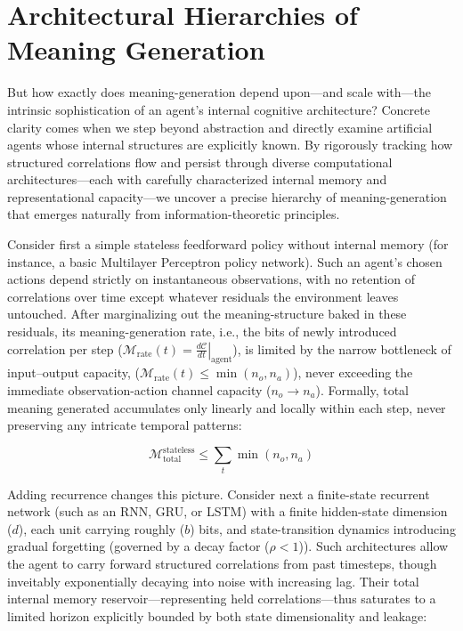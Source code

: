 \section{Architectural Hierarchies of Meaning Generation}\label{sec:architectures}

But how exactly does meaning-generation depend upon---and scale with---the intrinsic sophistication of an agent's internal cognitive architecture? Concrete clarity comes when we step beyond abstraction and directly examine artificial agents whose internal structures are explicitly known. By rigorously tracking how structured correlations flow and persist through diverse computational architectures---each with carefully characterized internal memory and representational capacity---we uncover a precise hierarchy of meaning-generation that emerges naturally from information-theoretic principles.

Consider first a simple stateless feedforward policy without internal memory (for instance, a basic Multilayer Perceptron policy network). Such an agent's chosen actions depend strictly on instantaneous observations, with no retention of correlations over time except whatever residuals the environment leaves untouched. After marginalizing out the meaning-structure baked in these residuals, its meaning-generation rate, i.e., the bits of newly introduced correlation per step ($\mathcal{M}_\text{rate}(t) = \left.\frac{d\mathcal{C}}{dt}\right\vert_{\text{agent}}$), is limited by the narrow bottleneck of input--output capacity, ($\mathcal{M}_\text{rate}(t) \leq \min(n_o, n_a)$), never exceeding the immediate observation-action channel capacity ($n_o \rightarrow n_a$). Formally, total meaning generated accumulates only linearly and locally within each step, never preserving any intricate temporal patterns:

\begin{equation*}
\mathcal{M}_{\text{total}}^{\text{stateless}} \leq \sum_t \min(n_o, n_a)
\end{equation*}

Adding recurrence changes this picture. Consider next a finite-state recurrent network (such as an RNN, GRU, or LSTM) with a finite hidden-state dimension ($d$), each unit carrying roughly ($b$) bits, and state-transition dynamics introducing gradual forgetting (governed by a decay factor ($\rho < 1$)). Such architectures allow the agent to carry forward structured correlations from past timesteps, though inveitably exponentially decaying into noise with increasing lag. Their total internal memory reservoir---representing held correlations---thus saturates to a limited horizon explicitly bounded by both state dimensionality and leakage:

